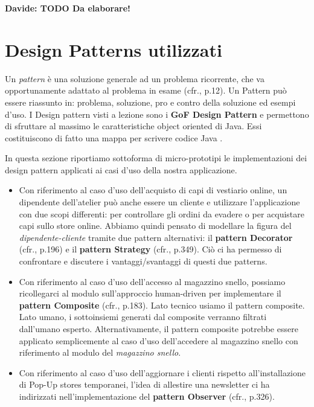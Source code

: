 \documentclass[12pt]{article}
\newcommand{\davide}[1]{{\bf \color{chromeyellow} Davide: #1 }}
\begin{document}
\davide{\textbf{TODO} Da elaborare!}


\section{Design Patterns utilizzati}

Un {\em pattern} è una soluzione generale ad un problema ricorrente, che va opportunamente adattato al problema in esame (cfr.\cite{gof_riferimento}, p.12). Un Pattern può essere riassunto in: problema, soluzione, pro e contro della soluzione ed esempi d’uso. I Design pattern visti a lezione sono i \textbf{GoF Design Pattern} e permettono di sfruttare al massimo le caratteristiche object oriented di Java. Essi costituiscono di fatto una mappa per scrivere codice Java \cite{gof_sunt}.

In questa sezione riportiamo sottoforma di micro-prototipi le implementazioni dei design pattern applicati ai casi d'uso della nostra applicazione.

\begin{itemize}
    \item Con riferimento al caso d'uso dell'acquisto di capi di vestiario online, un dipendente dell'atelier può anche essere un cliente e utilizzare l'applicazione con due scopi differenti: per controllare gli ordini da evadere o per acquistare capi sullo store online.
    Abbiamo quindi pensato di modellare la figura del {\em dipendente-cliente} tramite due pattern alternativi: il \textbf{pattern Decorator} (cfr.\cite{gof_riferimento}, p.196) e il \textbf{pattern Strategy} (cfr.\cite{gof_riferimento}, p.349). Ciò ci ha permesso di confrontare e discutere i vantaggi/svantaggi di questi due patterns.
    \item Con riferimento al caso d'uso dell'accesso al magazzino snello, possiamo ricollegarci al modulo sull'approccio human-driven per implementare il \textbf{pattern Composite} (cfr.\cite{gof_riferimento}, p.183). Lato tecnico usiamo il pattern composite. Lato umano, i sottoinsiemi generati dal composite verranno filtrati dall'umano esperto.
    Alternativamente, il pattern composite potrebbe essere applicato semplicemente al caso d'uso dell'accedere al magazzino snello con riferimento al modulo del {\em magazzino snello}.
    \item Con riferimento al caso d'uso dell'aggiornare i clienti rispetto all'installazione di Pop-Up stores temporanei, l’idea di allestire una newsletter ci ha indirizzati nell'implementazione del \textbf{pattern Observer} (cfr.\cite{gof_riferimento}, p.326).
\end{itemize}
\end{document}
